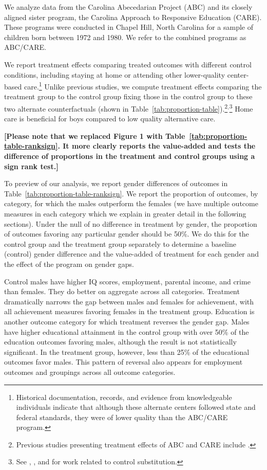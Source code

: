 We analyze data from the Carolina Abecedarian Project (ABC) and its closely aligned sister program, the Carolina Approach to Responsive Education (CARE). These programs were conducted in Chapel Hill, North Carolina for a sample of children born between 1972 and 1980. We refer to the combined programs as ABC/CARE.

We report treatment effects comparing treated outcomes with different control conditions, including staying at home or attending other lower-quality center-based care.\footnote{Historical documentation, records, and evidence from knowledgeable individuals indicate that although these alternate centers followed state and federal standards, they were of lower quality than the ABC/CARE program.} Unlike previous studies, we compute treatment effects comparing the treatment group to the control group fixing those in the control group to these two alternate counterfactuals (shown in Table~\ref{tab:proportion-table}).\footnote{Previous studies presenting treatment effects of ABC and CARE include \citet{Ramey_etal_1985_Project-CARE_TiECSE, Clarke_Campbell_1998_ABC_Comparison_ECRQ,Campbell_Pungello_etal_2001_DP,Campbell_Ramey_etal_2002_ADS,Campbell_Wasik_etal_2008_ECRQ,Campbell_Conti_etal_2014_EarlyChildhoodInvestments}.}$^,$\footnote{See \cite{Heckman_1992_randomization}, \cite{Heckman_Hohmann_etal_2000_QJE}, and \cite{Kline_Walters_2016_QJE} for work related to control substitution.} Home care is beneficial for boys compared to low quality alternative care.

\textbf{[Please note that we replaced Figure 1 with Table~\ref{tab:proportion-table-ranksign}. It more clearly reports the value-added and tests the difference of proportions in the treatment and control groups using a sign rank test.]}

To preview of our analysis, we report gender differences of outcomes in Table~\ref{tab:proportion-table-ranksign}. We report the proportion of outcomes, by category, for which the males outperform the females (we have multiple outcome measures in each category which we explain in greater detail in the following sections). Under the null of no difference in treatment by gender, the proportion of outcomes favoring any particular gender should be 50\%. We do this for the control group and the treatment group separately to determine a baseline (control) gender difference and the value-added of treatment for each gender and the effect of the program on gender gaps.

Control males have higher IQ scores, employment, parental income, and crime than females. They do better on aggregate across all categories. Treatment dramatically narrows the gap between males and females for achievement, with all achievement measures favoring females in the treatment group. Education is another outcome category for which treatment reverses the gender gap. Males have higher educational attainment in the control group with over 50\% of the education outcomes favoring males, although the result is not statistically significant. In the treatment group, however, less than 25\% of the educational outcomes favor males. This pattern of reversal also appears for employment outcomes and groupings across all outcome categories.

